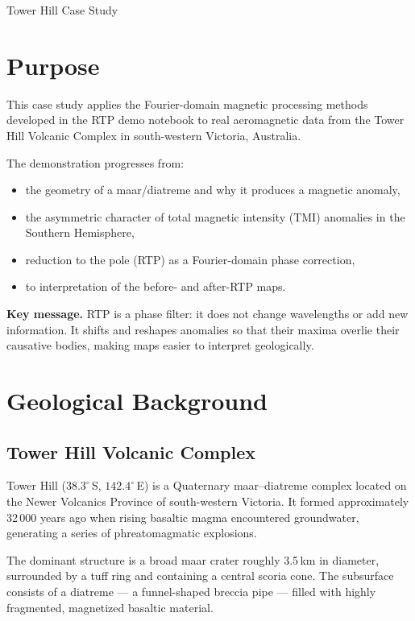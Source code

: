 \begin{activity}{Tower Hill Case Study}

\section{Purpose}

This case study applies the Fourier-domain magnetic processing methods developed in the RTP demo notebook to real aeromagnetic data from the Tower Hill Volcanic Complex in south-western Victoria, Australia.

The demonstration progresses from:
\begin{itemize}
  \item the geometry of a maar/diatreme and why it produces a magnetic anomaly,
  \item the asymmetric character of total magnetic intensity (TMI) anomalies
        in the Southern Hemisphere,
  \item reduction to the pole (RTP) as a Fourier-domain phase correction,
  \item to interpretation of the before- and after-RTP maps.
\end{itemize}

\noindent\textbf{Key message.}
RTP is a phase filter: it does not change wavelengths or add new information.
It shifts and reshapes anomalies so that their maxima overlie their causative
bodies, making maps easier to interpret geologically.

\section{Geological Background}

\subsection{Tower Hill Volcanic Complex}

Tower Hill ($38.3^\circ$\,S, $142.4^\circ$\,E) is a Quaternary maar–diatreme complex
located on the Newer Volcanics Province of south-western Victoria.
It formed approximately 32\,000 years ago when rising basaltic magma
encountered groundwater, generating a series of phreatomagmatic explosions.

The dominant structure is a broad maar crater roughly 3.5\,km in diameter,
surrounded by a tuff ring and containing a central scoria cone.
The subsurface consists of a diatreme --- a funnel-shaped breccia pipe ---
filled with highly fragmented, magnetized basaltic material.


\end{activity}
